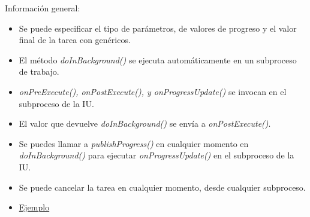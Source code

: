 \documentclass[4paper]{article}
\begin{document}
Información general:
\begin{itemize}
\item Se puede especificar el tipo de parámetros, de valores de progreso y el valor final de la tarea con genéricos.
\item El método \emph{doInBackground()} se ejecuta automáticamente en un subproceso de trabajo.
\item \emph{onPreExecute(), onPostExecute(), y onProgressUpdate()} se invocan en el subproceso de la IU.
\item El valor que devuelve \emph{doInBackground()} se envía a \emph{onPostExecute()}.
\item Se puedes llamar a \emph{publishProgress()} en cualquier momento en \emph{doInBackground()} para ejecutar \emph{onProgressUpdate()} en el subproceso de la IU.
\item Se puede cancelar la tarea en cualquier momento, desde cualquier subproceso.
\item \href{https://jarroba.com/asynctask-en-android/}{Ejemplo}
\end{itemize}
\end{document}
